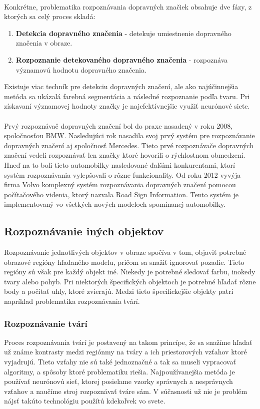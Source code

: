 \documentclass[12pt]{article}
\begin{document}
\paragraph{}
Konkrétne, problematika rozpoznávania dopravných značiek obsahuje dve fázy, z ktorých sa celý proces skladá:
\begin{enumerate}
  \item \textbf{Detekcia dopravného značenia} - detekuje umiestnenie dopravného značenia v obraze.
  \item \textbf{Rozpoznanie detekovaného dopravného značenia} - rozpoznáva významovú hodnotu dopravného značenia.
\end{enumerate} 
Existuje viac techník pre detekciu dopravných značení, ale ako najúčinnejšia metóda sa ukázalá farebná segmentácia a následné rozpoznanie podľa tvaru.
Pri získavaní významovej hodnoty značky je najefektívnejšie využiť neurónové siete.
\cite{tfs_pdf}
\paragraph{}
Prvý rozpoznávač dopravných značení bol do praxe nasadený v roku 2008, spoločnosťou BMW.\cite{bmw} Nasledujúci rok nasadila svoj prvý systém pre rozpoznávanie dopravných značení aj spoločnosť Mercedes.\cite{mercedes}
Tieto prvé rozpoznávače dopravných značení vedeli rozpoznávať len značky ktoré hovorili o rýchlostnom obmedzení. Hneď na to boli tieto automobilky nasledované ďalšími konkurentami, ktorí systém rozpoznávania vylepšovali o rôzne funkcionality.
Od roku 2012 vyvýja firma Volvo komplexný systém rozpoznávania dopravných značení pomocou počítačového videnia, ktorý nazvala Road Sign Information. Tento systém je implementovaný vo všetkých nových modeloch spomínanej automobilky.\cite{volvo}
\subsection{Rozpoznávanie iných objektov}
Rozpoznávanie jednotlivých objektov v obraze spočíva v tom, objaviť potrebné obrazové regióny hľadaného modelu, pričom sa snažiť ignorovať pozadie.
Tieto regióny sú však pre každý objekt iné. Niekedy je potrebné sledovať farbu, inokedy tvary alebo pohyb. Pri niektorých špecifických objektoch je potrebné hľadať rôzne body a počítať uhly, ktoré zvierajú.
Medzi tieto špecifickejšie objekty patrí napríklad problematika rozpoznávania tvárí.
\cite{object_rec_scene}
\subsubsection{Rozpoznávanie tvárí}
Proces rozpoznávania tvárí je postavený na takom princípe, že sa snažíme hľadať už známe kontrasty medzi regiónmy na tváry a ich priestorových vzťahov ktoré vyjadrujú.
Tieto vzťahy nie sú také jednoznačné a tak sa museli vypracovať algoritmy, a spôsoby ktoré problematiku riešia. 
Najpoužívanejšia metóda je používať neurónovú sieť, ktorej posielame vzorky správnych a nesprávnych vzťahov a naučíme stroj rozpoznávať tváre sám.
V súčasnosti už nie je problém nájsť takúto technológiu použítú kdekoľvek vo svete.
\cite{object_detection_viola}
\end{document}
